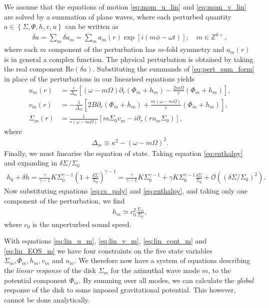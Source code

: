 We assume that the equations of motion \ref{eq:mom_u_lin} and \ref{eq:mom_v_lin} are solved by a summation of plane waves, where each perturbed quantity $a \in \left\{ \Sigma, \Phi, h, v, u \right\}$ can be written as
\begin{align}
    \delta a = \sum_m \delta a_m = \sum_m a_m(r) \exp \left[ i (m\phi - \omega t) \right]; \quad m \in \mathbb{Z}^{0+}, \label{eq:pert_sum_form}
\end{align}
where each $m$ component of the perturbation has $m$-fold symmetry and $a_m(r)$ is in general a complex function.
The physical perturbation is obtained by taking the real component $\mathrm{Re}(\delta a)$.
Substituting the summands of \ref{eq:pert_sum_form} in place of the perturbations in our linearised equations yields
\begin{align}
    u_m (r) &= \frac{i}{\Delta_m} \left[ (\omega - m \Omega) \partial_r (\Phi_m + h_m) - \frac{2 m \Omega}{r} (\Phi_m + h_m) \right] \label{eq:lin_u_m}, \\
    v_m (r) &= - \frac{1}{\Delta_m} \left[ 2B \partial_r (\Phi_m + h_m) + \frac{m(\omega - m \Omega)}{r} (\Phi_m + h_m) \right] \label{eq:lin_v_m}, \\
    \Sigma_m (r) &= \frac{1}{r(\omega - m \Omega)} \left[ m \Sigma_0 v_m -i \partial_r (r u_m \Sigma_0) \right] \label{eq:lin_cont_m},
\end{align}
where
\begin{align}
    \Delta_m \equiv \kappa^2 - (\omega - m \Omega)^2. \label{eq:def_delta_m}
\end{align}
Finally, we must linearise the equation of state.
Taking equation \ref{eq:enthalpy} and expanding in $\delta \Sigma / \Sigma_0$
\begin{align}
    h_0 + \delta h = \frac{\gamma}{\gamma - 1} K \Sigma_0^{\gamma - 1}(1 + \frac{\delta\Sigma}{\Sigma_0})^{\gamma-1} = \frac{\gamma}{\gamma - 1} K \Sigma_0^{\gamma - 1} + \gamma K \Sigma_0^{\gamma-1} \frac{\delta\Sigma}{\Sigma_0} + \mathcal{O}(\left(\delta\Sigma / \Sigma_0\right)^2).
\end{align}
Now substituting equations \ref{eq:cs_poly} and \ref{eq:enthalpy}, and taking only one component of the perturbation, we find
\begin{align}
    h_m \simeq c_0^2 \frac{\Sigma_m}{\Sigma_0}, \label{eq:lin_EOS_m}
\end{align}
where $c_0$ is the unperturbed sound speed.

With equations \ref{eq:lin_u_m}, \ref{eq:lin_v_m}, \ref{eq:lin_cont_m} and \ref{eq:lin_EOS_m} we have four constraints on the five state variables $\Sigma_m, \Phi_m, h_m, v_m$ and $u_m$.
We therefore now have a system of equations describing the \textit{linear response} of the disk $\Sigma_m$ for the azimuthal wave mode $m$, to the potential component $\Phi_m$.
By summing over all modes, we can calculate the \textit{global} response of the disk to some imposed gravitational potential.
This however, cannot be done analytically.

